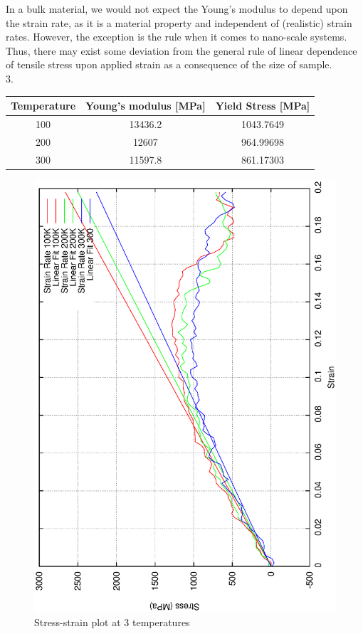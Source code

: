 \documentclass{article}
\begin{document}
In a bulk material, we would not expect the Young's modulus to depend upon the strain rate, as it is a material property and independent of (realistic) strain rates. However, the exception is the rule when it comes to nano-scale systems. Thus, there may exist some deviation from the general rule of linear dependence of tensile stress upon applied strain as a consequence of the size of sample.
\\
3.\begin{center}
\begin{tabular}{|c|c|c|}
  \hline
  Temperature & Young's modulus [MPa] &Yield Stress [MPa]\\
  \hline
  100 & 13436.2    & 1043.7649  \\ \hline
  200 & 12607  & 964.99698  \\ \hline
  300 & 11597.8 & 861.17303  \\ \hline
\end{tabular}
\end{center}
\begin{figure}[h!]
\centering
\includegraphics[totalheight=0.5\textheight, angle=-90]{se_curve3}
\caption{Stress-strain plot at 3 temperatures }
\label{fig:aNicePicture}
\end{figure}
\end{document}
